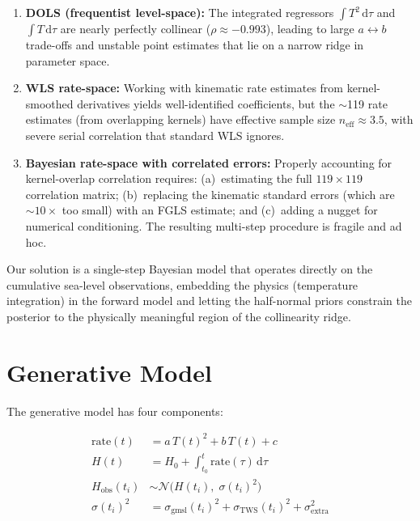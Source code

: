 \documentclass[11pt]{article}
\newcommand{\sigextra}{\sigma_{\text{extra}}}
\newcommand{\siggmsl}{\sigma_{\text{gmsl}}}
\newcommand{\sigtws}{\sigma_{\text{TWS}}}
\begin{document}
\begin{enumerate}
  \item \textbf{DOLS (frequentist level-space):} The integrated regressors $\int T^2\,\mathrm{d}\tau$ and $\int T\,\mathrm{d}\tau$ are nearly perfectly collinear ($\rho \approx -0.993$), leading to large $a \leftrightarrow b$ trade-offs and unstable point estimates that lie on a narrow ridge in parameter space.

  \item \textbf{WLS rate-space:} Working with kinematic rate estimates from kernel-smoothed derivatives yields well-identified coefficients, but the $\sim$119 rate estimates (from overlapping kernels) have effective sample size $n_{\text{eff}} \approx 3.5$, with severe serial correlation that standard WLS ignores.

  \item \textbf{Bayesian rate-space with correlated errors:} Properly accounting for kernel-overlap correlation requires: (a)~estimating the full $119 \times 119$ correlation matrix; (b)~replacing the kinematic standard errors (which are ${\sim}10\times$ too small) with an FGLS estimate; and (c)~adding a nugget for numerical conditioning.  The resulting multi-step procedure is fragile and ad hoc.
\end{enumerate}

Our solution is a single-step Bayesian model that operates directly on the cumulative sea-level observations, embedding the physics (temperature integration) in the forward model and letting the half-normal priors constrain the posterior to the physically meaningful region of the collinearity ridge.


\section{Generative Model}

The generative model has four components:

\begin{align}
  \text{rate}(t) &= a\,T(t)^2 + b\,T(t) + c
  \label{eq:gen_rate} \\
  H(t) &= H_0 + \int_{t_0}^{t} \text{rate}(\tau)\,\mathrm{d}\tau
  \label{eq:gen_level} \\
  H_{\text{obs}}(t_i) &\sim \mathcal{N}\bigl(H(t_i),\; \sigma(t_i)^2\bigr)
  \label{eq:gen_obs} \\
  \sigma(t_i)^2 &= \siggmsl(t_i)^2 + \sigtws(t_i)^2 + \sigextra^2
  \label{eq:gen_sigma}
\end{align}
\end{document}

